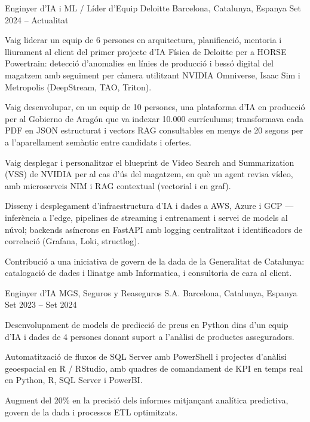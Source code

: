 
\begin{cventries}

\cventry
  {Enginyer d'IA i ML / Líder d'Equip}
  {Deloitte}
  {Barcelona, Catalunya, Espanya}
  {Set 2024 -- Actualitat}
  {
   \begin{cvitems}
    \item {Vaig liderar un equip de 6 persones en arquitectura, planificació, mentoria i lliurament al client del primer projecte d'IA Física de Deloitte per a HORSE Powertrain: detecció d'anomalies en línies de producció i bessó digital del magatzem amb seguiment per càmera utilitzant NVIDIA Omniverse, Isaac Sim i Metropolis (DeepStream, TAO, Triton).}
    \item {Vaig desenvolupar, en un equip de 10 persones, una plataforma d'IA en producció per al Gobierno de Aragón que va indexar 10.000 currículums; transformava cada PDF en JSON estructurat i vectors RAG consultables en menys de 20 segons per a l'aparellament semàntic entre candidats i ofertes.}
    \item {Vaig desplegar i personalitzar el blueprint de Video Search and Summarization (VSS) de NVIDIA per al cas d'ús del magatzem, en què un agent revisa vídeo, amb microserveis NIM i RAG contextual (vectorial i en graf).}
    \item {Disseny i desplegament d'infraestructura d'IA i dades a AWS, Azure i GCP --- inferència a l'edge, pipelines de streaming i entrenament i servei de models al núvol; backends asíncrons en FastAPI amb logging centralitzat i identificadors de correlació (Grafana, Loki, structlog).}
    \item {Contribució a una iniciativa de govern de la dada de la Generalitat de Catalunya: catalogació de dades i llinatge amb Informatica, i consultoria de cara al client.}
   \end{cvitems}
  }

\vspace{3mm}
\cventry
  {Enginyer d'IA}
  {MGS, Seguros y Reaseguros S.A.}
  {Barcelona, Catalunya, Espanya}
  {Set 2023 -- Set 2024}
  {
   \begin{cvitems}
    \item {Desenvolupament de models de predicció de preus en Python dins d'un equip d'IA i dades de 4 persones donant suport a l'anàlisi de productes asseguradors.}
    \item {Automatització de fluxos de SQL Server amb PowerShell i projectes d'anàlisi geoespacial en R / RStudio, amb quadres de comandament de KPI en temps real en Python, R, SQL Server i PowerBI.}
    \item {Augment del 20\% en la precisió dels informes mitjançant analítica predictiva, govern de la dada i processos ETL optimitzats.}
   \end{cvitems}
  }


\end{cventries}
